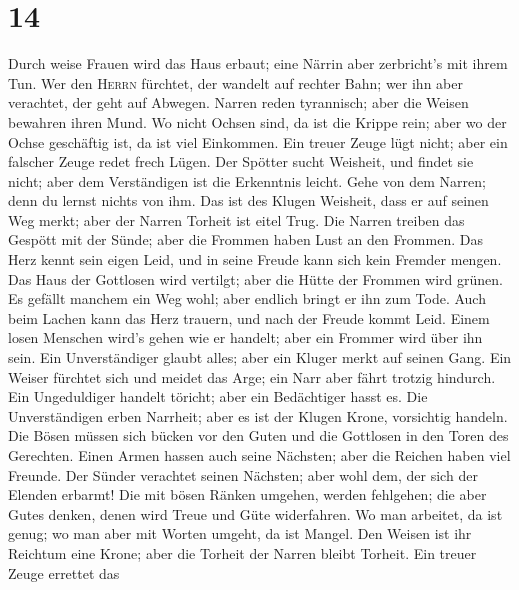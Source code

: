 \hypertarget{section-13}{%
\section{14}\label{section-13}}

 Durch weise Frauen wird das Haus erbaut; eine Närrin aber
zerbricht's mit ihrem Tun.  Wer den \textsc{Herrn}
fürchtet, der wandelt auf rechter Bahn; wer ihn aber verachtet, der geht
auf Abwegen.  Narren reden tyrannisch; aber die Weisen
bewahren ihren Mund.  Wo nicht Ochsen sind, da ist die
Krippe rein; aber wo der Ochse geschäftig ist, da ist viel Einkommen.
 Ein treuer Zeuge lügt nicht; aber ein falscher Zeuge
redet frech Lügen.  Der Spötter sucht Weisheit, und findet
sie nicht; aber dem Verständigen ist die Erkenntnis leicht.
 Gehe von dem Narren; denn du lernst nichts von ihm.
 Das ist des Klugen Weisheit, dass er auf seinen Weg
merkt; aber der Narren Torheit ist eitel Trug.  Die Narren
treiben das Gespött mit der Sünde; aber die Frommen haben Lust an den
Frommen.  Das Herz kennt sein eigen Leid, und in seine
Freude kann sich kein Fremder mengen.  Das Haus der
Gottlosen wird vertilgt; aber die Hütte der Frommen wird grünen.
 Es gefällt manchem ein Weg wohl; aber endlich bringt er
ihn zum Tode.  Auch beim Lachen kann das Herz trauern,
und nach der Freude kommt Leid.  Einem losen Menschen
wird's gehen wie er handelt; aber ein Frommer wird über ihn sein.
 Ein Unverständiger glaubt alles; aber ein Kluger merkt
auf seinen Gang.  Ein Weiser fürchtet sich und meidet das
Arge; ein Narr aber fährt trotzig hindurch.  Ein
Ungeduldiger handelt töricht; aber ein Bedächtiger hasst es.
 Die Unverständigen erben Narrheit; aber es ist der
Klugen Krone, vorsichtig handeln.  Die Bösen müssen sich
bücken vor den Guten und die Gottlosen in den Toren des Gerechten.
 Einen Armen hassen auch seine Nächsten; aber die Reichen
haben viel Freunde.  Der Sünder verachtet seinen
Nächsten; aber wohl dem, der sich der Elenden erbarmt! 
Die mit bösen Ränken umgehen, werden fehlgehen; die aber Gutes denken,
denen wird Treue und Güte widerfahren.  Wo man arbeitet,
da ist genug; wo man aber mit Worten umgeht, da ist Mangel.
 Den Weisen ist ihr Reichtum eine Krone; aber die Torheit
der Narren bleibt Torheit.  Ein treuer Zeuge errettet das
